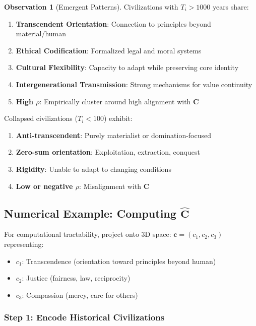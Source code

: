 \documentclass[11pt,a4paper]{article}
\theoremstyle{definition}
\newtheorem{observation}{Observation}[section]
\theoremstyle{remark}
\begin{document}
\begin{observation}[Emergent Patterns]
Civilizations with \(T_i > 1000\) years share:
\begin{enumerate}
\item \textbf{Transcendent Orientation}: Connection to principles beyond material/human
\item \textbf{Ethical Codification}: Formalized legal and moral systems
\item \textbf{Cultural Flexibility}: Capacity to adapt while preserving core identity
\item \textbf{Intergenerational Transmission}: Strong mechanisms for value continuity
\item \textbf{High \(\rho\)}: Empirically cluster around high alignment with \(\mathbf{C}\)
\end{enumerate}

Collapsed civilizations (\(T_i < 100\)) exhibit:
\begin{enumerate}
\item \textbf{Anti-transcendent}: Purely materialist or domination-focused
\item \textbf{Zero-sum orientation}: Exploitation, extraction, conquest
\item \textbf{Rigidity}: Unable to adapt to changing conditions
\item \textbf{Low or negative \(\rho\)}: Misalignment with \(\mathbf{C}\)
\end{enumerate}
\end{observation}

\subsection{Numerical Example: Computing \(\hat{\mathbf{C}}\)}

For computational tractability, project onto 3D space: \(\mathbf{c} = (c_1, c_2, c_3)\) representing:
\begin{itemize}
\item \(c_1\): Transcendence (orientation toward principles beyond human)
\item \(c_2\): Justice (fairness, law, reciprocity)
\item \(c_3\): Compassion (mercy, care for others)
\end{itemize}

\subsubsection{Step 1: Encode Historical Civilizations}
\end{document}
